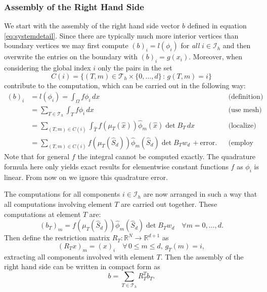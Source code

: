 \documentclass[a4paper,12pt]{article}
\begin{document}
\subsubsection*{Assembly of the Right Hand Side}

We start with the assembly of the right hand side vector $b$
defined in equation \eqref{eq:systemdetail}. Since there are typically much more 
interior vertices than boundary vertices we may first compute $(b)_i = l(\phi_i)$
for {\em all} $i\in\mathcal{I}_h$ and then overwrite the entries on the boundary
with $(b)_i = g(x_i)$. Moreover, when considering the global index $i$
only the pairs in the set
$$C(i) = \{(T,m)\in\mathcal{T}_h\times\{0,\ldots,d\} \,:\, g(T,m)=i\}$$
contribute to the computation, which can be carried out in the following way:
\begin{align*}
(b)_i &= l(\phi_i) = \int_\Omega f \phi_i\,dx &&\text{(definition)} \\
&= \sum_{T\in\mathcal{T}_h} \int_T f \phi_i\,dx &&\text{(use mesh)} \\
&= \sum_{(T,m)\in C(i)} \int_{\hat T} f(\mu_T(\hat x)) \hat\phi_m(\hat x) \det B_T\,dx 
&&\text{(localize)} \\
&= \sum_{(T,m)\in C(i)} 
f(\mu_T(\hat S_d)) \hat\phi_m(\hat S_d) \det B_T w_d \, + \text{error}. &&\text{(employ quadrature)} 
\end{align*}
Note that for general $f$ the integral cannot be computed exactly. The
quadrature formula here only yields exact results for elementwise constant
functions $f$ as $\phi_i$ is linear. From now on we ignore this quadrature error.

The computations for all components $i\in\mathcal{I}_h$ are now arranged
in such a way that all computations involving element $T$ are carried out together.
These computations at element $T$ are:
\begin{equation}
(b_T)_m =  f(\mu_T(\hat S_d)) \hat\phi_m(\hat S_d) \det B_T w_d \quad \forall m=0,\ldots,d .
\label{eq:lambda_volume}
\end{equation}
Then define the restriction matrix 
$R_T : \mathbb{R}^N \to \mathbb{R}^{d+1}$ as
\begin{equation}
(R_T x)_m = (x)_i \quad \forall \,0\leq m \leq d, \,g_T(m)=i,
\end{equation}
extracting all components involved with element $T$. Then
the assembly of the right hand side can be written in compact form as
\begin{equation}
b = \sum_{T\in\mathcal{T}_h} R_T^T b_T .
\label{eq:rhsassembly}
\end{equation}
\end{document}
